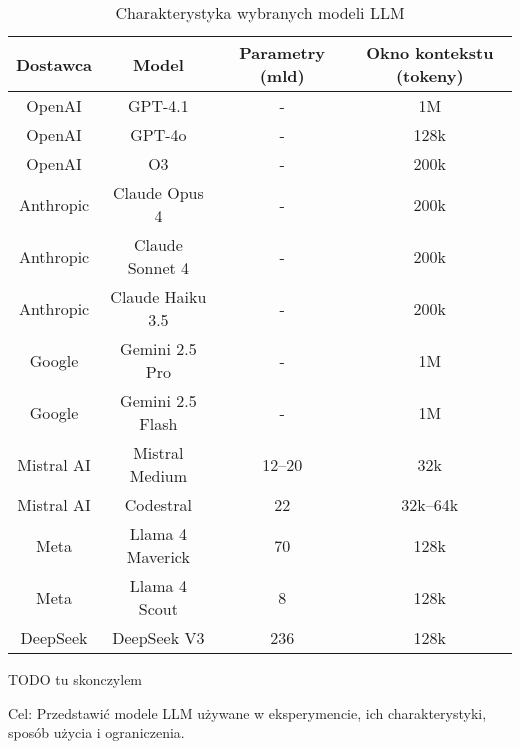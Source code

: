 \begin{table}[!h] \centering
\caption{Charakterystyka wybranych modeli LLM}
\label{tab:llm-characteristic}
\begin{tabular}{| c | c | c | c |} \hline
\textbf{Dostawca} & \textbf{Model} & \textbf{Parametry (mld)} & \textbf{Okno kontekstu (tokeny)} \\ \hline\hline
OpenAI & GPT-4.1 & - & 1M \\ \hline
OpenAI & GPT-4o & - & 128k \\ \hline
OpenAI & O3 & - & 200k \\ \hline
Anthropic & Claude Opus 4 & - & 200k \\ \hline
Anthropic & Claude Sonnet 4 & - & 200k \\ \hline
Anthropic & Claude Haiku 3.5 & - & 200k \\ \hline
Google & Gemini 2.5 Pro & - & 1M \\ \hline
Google & Gemini 2.5 Flash & - & 1M \\ \hline
Mistral AI & Mistral Medium & 12–20 & 32k \\ \hline
Mistral AI & Codestral & 22 & 32k–64k \\ \hline
Meta & Llama 4 Maverick & 70 & 128k \\ \hline
Meta & Llama 4 Scout & 8 & 128k \\ \hline
DeepSeek & DeepSeek V3 & 236 & 128k \\ \hline
\end{tabular}
\end{table}

TODO tu skonczylem

Cel: Przedstawić modele LLM używane w eksperymencie, ich charakterystyki, sposób użycia i ograniczenia.

